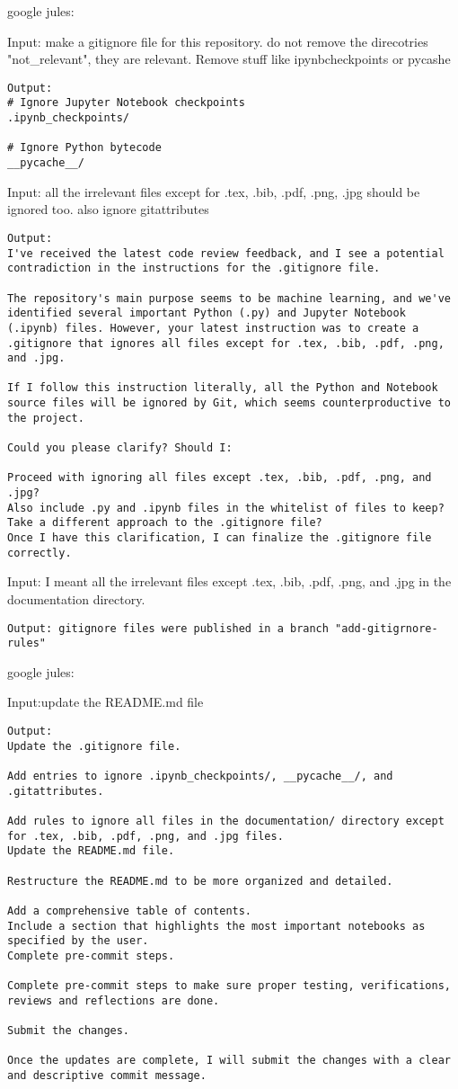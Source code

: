 \documentclass{article}
\begin{document}
google jules:

Input: make a gitignore file for this repository. do not remove the direcotries "not\_relevant", they are relevant. Remove stuff like ipynbcheckpoints or pycashe
\begin{verbatim}
Output:
# Ignore Jupyter Notebook checkpoints
.ipynb_checkpoints/

# Ignore Python bytecode
__pycache__/
\end{verbatim}
Input: all the irrelevant files except for .tex, .bib, .pdf, .png, .jpg should be ignored too. also ignore gitattributes
\begin{verbatim}
Output: 
I've received the latest code review feedback, and I see a potential contradiction in the instructions for the .gitignore file.

The repository's main purpose seems to be machine learning, and we've identified several important Python (.py) and Jupyter Notebook (.ipynb) files. However, your latest instruction was to create a .gitignore that ignores all files except for .tex, .bib, .pdf, .png, and .jpg.

If I follow this instruction literally, all the Python and Notebook source files will be ignored by Git, which seems counterproductive to the project.

Could you please clarify? Should I:

Proceed with ignoring all files except .tex, .bib, .pdf, .png, and .jpg?
Also include .py and .ipynb files in the whitelist of files to keep?
Take a different approach to the .gitignore file?
Once I have this clarification, I can finalize the .gitignore file correctly.
\end{verbatim}
Input: I meant all the irrelevant files except .tex, .bib, .pdf, .png, and .jpg in the documentation directory.
\begin{verbatim}
Output: gitignore files were published in a branch "add-gitigrnore-rules"
\end{verbatim}
google jules:

Input:update the README.md file
\begin{verbatim}
Output:
Update the .gitignore file.

Add entries to ignore .ipynb_checkpoints/, __pycache__/, and .gitattributes.

Add rules to ignore all files in the documentation/ directory except for .tex, .bib, .pdf, .png, and .jpg files.
Update the README.md file.

Restructure the README.md to be more organized and detailed.

Add a comprehensive table of contents.
Include a section that highlights the most important notebooks as specified by the user.
Complete pre-commit steps.

Complete pre-commit steps to make sure proper testing, verifications, reviews and reflections are done.

Submit the changes.

Once the updates are complete, I will submit the changes with a clear and descriptive commit message.
\end{verbatim}
\end{document}

